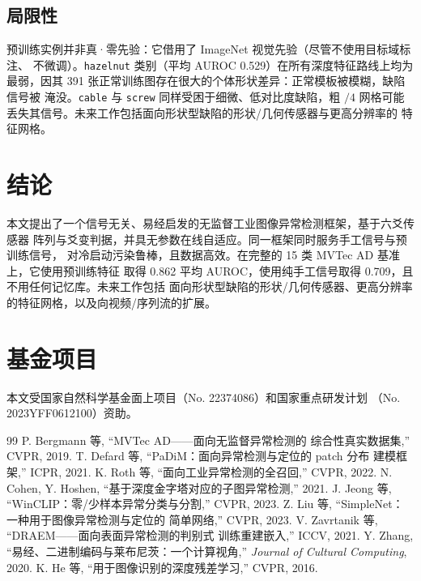 \documentclass[journal,10pt]{IEEEtran}
\begin{document}
\subsection{局限性}
预训练实例并非真·零先验：它借用了 ImageNet 视觉先验（尽管不使用目标域标注、
不微调）。\texttt{hazelnut} 类别（平均 AUROC 0.529）在所有深度特征路线上均为
最弱，因其 391 张正常训练图存在很大的个体形状差异：正常模板被模糊，缺陷信号被
淹没。\texttt{cable} 与 \texttt{screw} 同样受困于细微、低对比度缺陷，粗 $/4$
网格可能丢失其信号。未来工作包括面向形状型缺陷的形状/几何传感器与更高分辨率的
特征网格。

\section{结论}
本文提出了一个信号无关、易经启发的无监督工业图像异常检测框架，基于六爻传感器
阵列与爻变判据，并具无参数在线自适应。同一框架同时服务手工信号与预训练信号，
对冷启动污染鲁棒，且数据高效。在完整的 15 类 MVTec AD 基准上，它使用预训练特征
取得 0.862 平均 AUROC，使用纯手工信号取得 0.709，且不用任何记忆库。未来工作包括
面向形状型缺陷的形状/几何传感器、更高分辨率的特征网格，以及向视频/序列流的扩展。

\section*{基金项目}
本文受国家自然科学基金面上项目（No. 22374086）和国家重点研发计划
（No. 2023YFF0612100）资助。


\begin{thebibliography}{99}
 P. Bergmann 等, “MVTec AD——面向无监督异常检测的
综合性真实数据集,” CVPR, 2019.
 T. Defard 等, “PaDiM：面向异常检测与定位的 patch 分布
建模框架,” ICPR, 2021.
 K. Roth 等, “面向工业异常检测的全召回,” CVPR, 2022.
 N. Cohen, Y. Hoshen, “基于深度金字塔对应的子图异常检测,”
2021.
 J. Jeong 等, “WinCLIP：零/少样本异常分类与分割,”
CVPR, 2023.
 Z. Liu 等, “SimpleNet：一种用于图像异常检测与定位的
简单网络,” CVPR, 2023.
 V. Zavrtanik 等, “DRAEM——面向表面异常检测的判别式
训练重建嵌入,” ICCV, 2021.
 Y. Zhang, “易经、二进制编码与莱布尼茨：一个计算视角,”
\emph{Journal of Cultural Computing}, 2020.
 K. He 等, “用于图像识别的深度残差学习,” CVPR, 2016.
\end{thebibliography}
\end{document}
